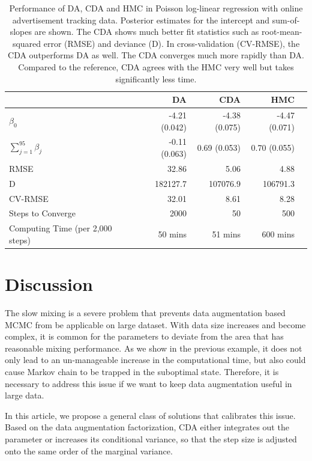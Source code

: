 \documentclass[10pt]{article}
\begin{document}
\begin{table}[H]
\centering
\begin{tabular}{|l |r |r| r| r |} 
 \hline
                          & DA & CDA & HMC\\
 [0.5ex]
 \hline
$\beta_0$                         & -4.21 (0.042)& -4.38 (0.075) & -4.47 (0.071) \\
$\sum_{j=1}^{95} \beta_j$         & -0.11 (0.063)& 0.69 (0.053)  & 0.70 (0.055)  \\
RMSE                              & 32.86        & 5.06          & 4.88\\
D                                 & 182127.7     & 107076.9      & 106791.3\\
CV-RMSE                           & 32.01        & 8.61          & 8.28\\
Steps to Converge                 & 2000         & 50            & 500 \\
Computing Time (per 2,000 steps)  & 50 mins       & 51 mins        & 600 mins\\
 \hline
\end{tabular}
\caption{Performance of DA, CDA and HMC in Poisson log-linear regression with online advertisement tracking data. Posterior estimates for the intercept and sum-of-slopes are shown. The CDA shows much better fit statistics such as root-mean-squared error (RMSE) and deviance (D). In cross-validation (CV-RMSE), the CDA outperforms DA as well. The CDA converges much more rapidly than DA. Compared to the reference, CDA agrees with the HMC very well but takes significantly less time.}
\label{table:Poisson}
\end{table}


\section{Discussion}

The slow mixing is a severe problem that prevents data augmentation based MCMC from be applicable on large dataset. With data size increases and become complex, it is common for the parameters to deviate from the area that has reasonable mixing performance. As we show in the previous example, it does not only lead to an un-manageable increase in the computational time, but also could cause Markov chain to be trapped in the suboptimal state.  Therefore, it is necessary to address this issue if we want to keep data augmentation useful in large data.

In this article, we propose a general class of solutions that calibrates this issue. Based on the data augmentation factorization, CDA either integrates out the parameter or increases its conditional variance, so that the step size is adjusted onto the same order of the marginal variance. 
\end{document}
